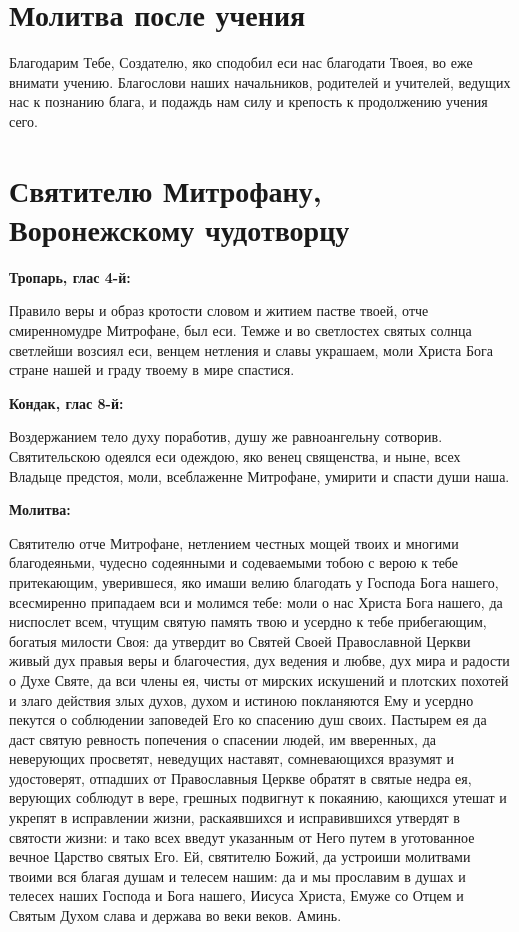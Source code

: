 \section{Молитва после учения}
 


Благодарим Тебе, Создателю, яко сподобил еси нас благодати Твоея, во еже внимати учению. Благослови наших начальников, родителей и учителей, ведущих нас к познанию блага, и подаждь нам силу и крепость к продолжению учения сего.



 

\section{Святителю Митрофану, Воронежскому чудотворцу}
 
\bfseries Тропарь, глас 4-й:\normalfont{}


Правило веры и образ кротости словом и житием пастве твоей, отче смиренномудре Митрофане, был еси. Темже и во светлостех святых солнца светлейши возсиял еси, венцем нетления и славы украшаем, моли Христа Бога стране нашей и граду твоему в мире спастися.

\medskip
\bfseries Кондак, глас 8-й:\normalfont{}


Воздержанием тело духу поработив, душу же равноангельну сотворив. Святительскою одеялся еси одеждою, яко венец священства, и ныне, всех Владыце предстоя, моли, всеблаженне Митрофане, умирити и спасти души наша.

\medskip
\bfseries Молитва:\normalfont{}


Святителю отче Митрофане, нетлением честных мощей твоих и многими благодеяньми, чудесно содеянными и содеваемыми тобою с верою к тебе притекающим, уверившеся, яко имаши велию благодать у Господа Бога нашего, всесмиренно припадаем вси и молимся тебе: моли о нас Христа Бога нашего, да ниспослет всем, чтущим святую память твою и усердно к тебе прибегающим, богатыя милости Своя: да утвердит во Святей Своей Православной Церкви живый дух правыя веры и благочестия, дух ведения и любве, дух мира и радости о Духе Святе, да вси члены ея, чисты от мирских искушений и плотских похотей и злаго действия злых духов, духом и истиною покланяются Ему и усердно пекутся о соблюдении заповедей Его ко спасению душ своих. Пастырем ея да даст святую ревность попечения о спасении людей, им вверенных, да неверующих просветят, неведущих наставят, сомневающихся вразумят и удостоверят, отпадших от Православныя Церкве обратят в святые недра ея, верующих соблюдут в вере, грешных подвигнут к покаянию, кающихся утешат и укрепят в исправлении жизни, раскаявшихся и исправившихся утвердят в святости жизни: и тако всех введут указанным от Него путем в уготованное вечное Царство святых Его. Ей, святителю Божий, да устроиши молитвами твоими вся благая душам и телесем нашим: да и мы прославим в душах и телесех наших Господа и Бога нашего, Иисуса Христа, Емуже со Отцем и Святым Духом слава и держава во веки веков. Аминь.


